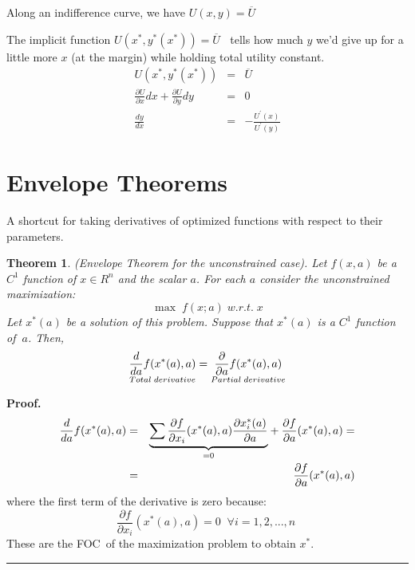 \documentclass[11pt,english]{article}
\newtheorem{theorem}{Theorem}
\newenvironment{proof}[1][Proof]{\textbf{#1.} }{\ \rule{0.5em}{0.5em}}
\begin{document}
Along an indifference curve, we have $U(x,y)=\overline{U}$

The implicit function $U(x^{\ast },y^{\ast }(x^{\ast }))=\overline{U}$ $\ $%
tells how much $y$ we'd give up for a little more $x$ (at the margin) while
holding total utility constant. 
\begin{eqnarray*}
U(x^{\ast },y^{\ast }(x^{\ast })) &=&\overline{U} \\
\frac{\partial U}{\partial x}dx+\frac{\partial U}{\partial y}dy &=&0 \\
\frac{dy}{dx} &=&-\frac{U^{\prime }(x)}{U^{\prime }(y)}
\end{eqnarray*}

\bigskip

\section{Envelope Theorems}

\bigskip

A shortcut for taking derivatives of optimized functions with respect to
their parameters.

\begin{theorem}
(Envelope Theorem for the unconstrained case). Let $f(x,a)$ be a $C^{1}$
function of $x\in R^{n}$ and the scalar $a$. For each $a$ consider the
unconstrained maximization: 
\begin{equation*}
\max \;f(x;a)\;w.r.t.\;x
\end{equation*}%
Let $x^{\ast }\left( a\right) $ be a solution of this problem. Suppose that $%
x^{\ast }(a)$ is a $C^{1}$ function of $\ a$. Then, 
\begin{equation*}
\underset{Total\;derivative}{\frac{d}{da}f(x^{\ast }(a),a)}=\underset{%
Partial\;derivative}{\frac{\partial }{\partial a}f(x^{\ast }(a),a)}
\end{equation*}
\end{theorem}

\bigskip

\begin{proof}
\begin{eqnarray*}
\frac{d}{da}f(x^{\ast }(a),a) &=&\underset{=0}{\underbrace{\sum \frac{%
\partial f}{\partial x_{i}}(x^{\ast }(a),a)\frac{\partial x_{i}^{\ast }(a)}{%
\partial a}}}+\frac{\partial f}{\partial a}(x^{\ast }(a),a)= \\
&=&\frac{\partial f}{\partial a}(x^{\ast }(a),a)
\end{eqnarray*}%
where the first term of the derivative is zero because: 
\begin{equation*}
\frac{\partial f}{\partial x_{i}}(x^{\ast }(a),a)=0\;\;\forall i=1,2,...,n\;
\end{equation*}%
These are the FOC\ of the maximization problem to obtain $x^{\ast }$.
\end{proof}
\end{document}
